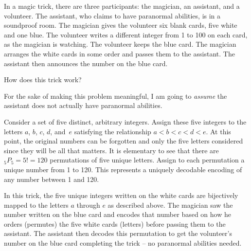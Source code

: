 \newpage
\begin{problem}{15}{5}
  In a magic trick, there are three participants: the magician, an assistant, and a volunteer.  The assistant, who claims to have paranormal abilities, is in a soundproof room.  The magician gives the volunteer six blank cards, five white and one blue.  The volunteer writes a different integer from 1 to 100 on each card, as the magician is watching.  The volunteer keeps the blue card. The magician arranges the white cards in some order and passes them to the assistant. The assistant then announces the number on the blue card.

  How does this trick work?
\end{problem}

For the sake of making this problem meaningful, I am going to \textit{assume} the assistant does not actually have paranormal abilities.

Consider a set of five distinct, arbitrary integers.  Assign these five integers to the letters $a$, $b$, $c$, $d$, and~$e$ satisfying the relationship ${a < b < c < d < e}$.  At this point, the original numbers can be forgotten and only the five letters considered since they will be all that matters.  It is elementary to see that there are ${}_{5}P_{5} = 5! = 120$ permutations of five unique letters.  Assign to each permutation a unique number from 1 to 120.  This represents a uniquely decodable encoding of any number between 1 and 120.

In this trick, the five unique integers written on the white cards are bijectively mapped to the letters $a$ through $e$ as described above.  The magician saw the number written on the blue card and encodes that number based on how he orders (permutes) the five white cards (letters) before passing them to the assistant.  The assistant then decodes this permutation to get the volunteer's number on the blue card completing the trick -- no paranormal abilities needed.

